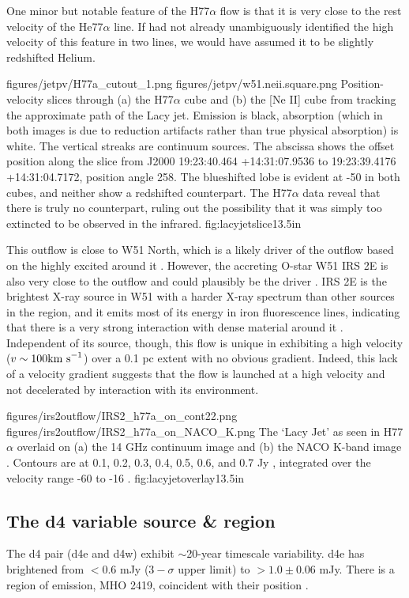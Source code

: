 One minor but notable feature of the H77$\alpha$ flow is that it is very close
to the rest velocity of the He77$\alpha$ line.  If \citet{Lacy2007a} had not
already unambiguously identified the high velocity of this feature in two
lines, we would have assumed it to be slightly redshifted Helium.

\FigureTwo
{figures/jetpv/H77a_cutout_1.png}
{figures/jetpv/w51.neii.square.png}
{Position-velocity slices through (a) the H77$\alpha$ cube and (b) the [Ne II]
cube from \citet{Lacy2007a} tracking the approximate path of the Lacy jet.  Emission is black,
absorption (which in both images is due to reduction artifacts rather than true
physical absorption) is white.  The vertical streaks are continuum sources.
The
abscissa shows the offset position along the slice from J2000 19:23:40.464
+14:31:07.9536 to 19:23:39.4176 +14:31:04.7172, position angle 258\arcdeg.
The blueshifted lobe is evident at -50 \kms in both cubes, and neither show a
redshifted counterpart.  The H77$\alpha$ data reveal that there is truly no
counterpart, ruling out the possibility that it was simply too extincted to be
observed in the infrared.}
{fig:lacyjetslice}{1}{3.5in}

This outflow is close to W51 North, which is a likely driver of the outflow based
on the highly excited \ammonia around it \citep{Henkel2013a,Goddi2015a}.  However,
the accreting O-star W51 IRS 2E is also very close to the outflow and could plausibly
be the driver \citep{Barbosa2008a}.  IRS 2E is the brightest X-ray source in
W51 with a harder X-ray spectrum than other sources in the region, and it emits
most of its energy in iron fluorescence lines, indicating that there is a very
strong interaction with dense material around it \citep{Townsley2014a}.
Independent of its source, though, this flow is unique in exhibiting a high
velocity ($v\sim100 \textrm{km~s}^{-1}$) over a 0.1 pc extent with no obvious gradient.
Indeed, this lack of a velocity gradient suggests that the flow is launched
at a high velocity and not decelerated by interaction with its environment.


\FigureTwo
{figures/irs2outflow/IRS2_h77a_on_cont22.png} %
{figures/irs2outflow/IRS2_h77a_on_NACO_K.png} %
{The `Lacy Jet' as seen in H77$\alpha$ overlaid on (a) the 14 GHz continuum
image and (b) the NACO K-band image \citep{Barbosa2008a}.  Contours are at 
0.1, 0.2, 0.3, 0.4, 0.5, 0.6, and 0.7 Jy \kms, integrated over the velocity
range -60 to -16 \kms.}
{fig:lacyjetoverlay}{1}{3.5in}

\subsection{The d4 variable source \& \hh region}
\label{sec:d4}
The d4 pair (d4e and d4w) exhibit $\sim$20-year timescale variability.  d4e has
brightened from $<0.6$ mJy ($3-\sigma$ upper limit) to $>1.0\pm0.06$ mJy.
There is a region of \hh emission, MHO 2419, coincident with their position
\citep[Figure \ref{fig:d4h2}][]{Hodapp2002a,Froebrich2011a}.


